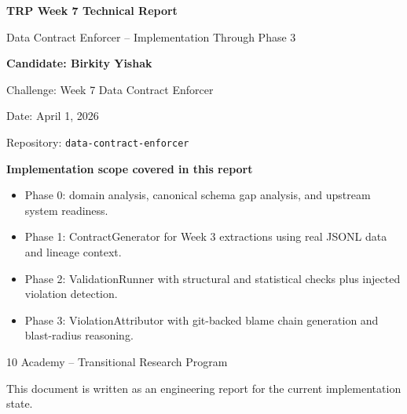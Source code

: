 \documentclass[11pt]{report}
\begin{document}
\begin{titlepage}
\pagecolor{mist}
\centering
\vspace*{1.7cm}

{\Huge\bfseries\color{navy} TRP Week 7 Technical Report\par}
\vspace{0.5cm}
{\Large\color{teal} Data Contract Enforcer -- Implementation Through Phase 3\par}
\vspace{1.2cm}

\begin{tcolorbox}[width=0.9\textwidth,colback=white,colframe=navy,boxrule=1pt,arc=2mm]
\centering
{\Large\bfseries Candidate: Birkity Yishak\par}
\vspace{0.3cm}
{\large Challenge: Week 7 Data Contract Enforcer\par}
\vspace{0.2cm}
{\large Date: April 1, 2026\par}
\vspace{0.2cm}
{\large Repository: \texttt{data-contract-enforcer}\par}
\end{tcolorbox}

\vfill

\begin{tcolorbox}[width=0.88\textwidth,colback=white,colframe=teal,boxrule=0.8pt,arc=2mm]
\raggedright
\textbf{Implementation scope covered in this report}
\begin{itemize}[leftmargin=1.5em,itemsep=0.3em]
  \item Phase 0: domain analysis, canonical schema gap analysis, and upstream system readiness.
  \item Phase 1: ContractGenerator for Week 3 extractions using real JSONL data and lineage context.
  \item Phase 2: ValidationRunner with structural and statistical checks plus injected violation detection.
  \item Phase 3: ViolationAttributor with git-backed blame chain generation and blast-radius reasoning.
\end{itemize}
\end{tcolorbox}

\vfill
{\large\color{slate} 10 Academy -- Transitional Research Program\par}
\vspace{0.5cm}
{\small\color{slate} This document is written as an engineering report for the current implementation state.\par}

\end{titlepage}
\nopagecolor
\end{document}
